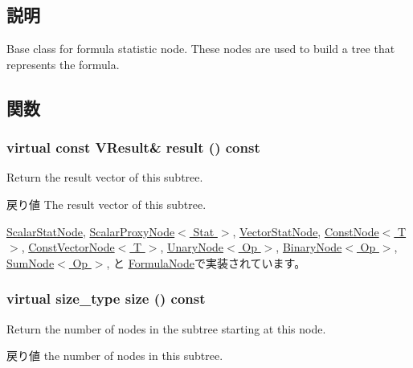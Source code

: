 \subsection{説明}
Base class for formula statistic node. These nodes are used to build a tree that represents the formula. 

\subsection{関数}
\hypertarget{classStats_1_1Node_a7fcf57115122663db42f39cc18ca0f62}{
\subsubsection[{result}]{\setlength{\rightskip}{0pt plus 5cm}virtual const {\bf VResult}\& result () const}}
\label{classStats_1_1Node_a7fcf57115122663db42f39cc18ca0f62}
Return the result vector of this subtree. \begin{DoxyReturn}{戻り値}
The result vector of this subtree. 
\end{DoxyReturn}


\hyperlink{classStats_1_1ScalarStatNode_aba312f9e3431b1652f8b3ddf3fe105dc}{ScalarStatNode}, \hyperlink{classStats_1_1ScalarProxyNode_aba312f9e3431b1652f8b3ddf3fe105dc}{ScalarProxyNode$<$ Stat $>$}, \hyperlink{classStats_1_1VectorStatNode_aba312f9e3431b1652f8b3ddf3fe105dc}{VectorStatNode}, \hyperlink{classStats_1_1ConstNode_aba312f9e3431b1652f8b3ddf3fe105dc}{ConstNode$<$ T $>$}, \hyperlink{classStats_1_1ConstVectorNode_aba312f9e3431b1652f8b3ddf3fe105dc}{ConstVectorNode$<$ T $>$}, \hyperlink{classStats_1_1UnaryNode_aba312f9e3431b1652f8b3ddf3fe105dc}{UnaryNode$<$ Op $>$}, \hyperlink{classStats_1_1BinaryNode_aba312f9e3431b1652f8b3ddf3fe105dc}{BinaryNode$<$ Op $>$}, \hyperlink{classStats_1_1SumNode_aba312f9e3431b1652f8b3ddf3fe105dc}{SumNode$<$ Op $>$}, と \hyperlink{classStats_1_1FormulaNode_aba312f9e3431b1652f8b3ddf3fe105dc}{FormulaNode}で実装されています。\hypertarget{classStats_1_1Node_a4051d143efd31726fa13df03ae4e1bce}{
\subsubsection[{size}]{\setlength{\rightskip}{0pt plus 5cm}virtual {\bf size\_\-type} size () const}}
\label{classStats_1_1Node_a4051d143efd31726fa13df03ae4e1bce}
Return the number of nodes in the subtree starting at this node. \begin{DoxyReturn}{戻り値}
the number of nodes in this subtree. 
\end{DoxyReturn}


